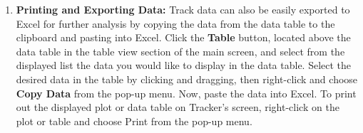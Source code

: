 \begin{enumerate}
\item {\bf Printing and Exporting Data:} Track data can also be easily exported to Excel for 
further analysis by copying the data from the 
data table to the clipboard and pasting into Excel. 
Click the {\bf Table} button, located above the data table in the table view section of the main screen, 
and select from the displayed list the data you would like to display in the data table. 
Select the desired data in the table by clicking and dragging, then right-click and choose {\bf Copy Data} 
from the pop-up menu. 
Now, paste the data into Excel.
To print out the displayed  plot or data table on Tracker's screen, 
right-click on the plot or table and choose Print from the pop-up menu.

\end{enumerate}


